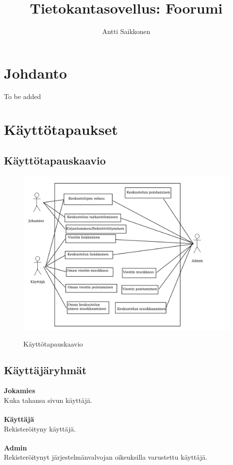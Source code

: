 \documentclass[11pt]{article}
\title{\textbf{Tietokantasovellus: Foorumi}}
\author{Antti Saikkonen}
\date{}
\begin{document}
\maketitle
\newpage

\section{Johdanto}
To be added


\newpage
\section{Käyttötapaukset}

\subsection{Käyttötapauskaavio}
\begin{figure}[h]
\centering 
{\includegraphics[scale=0.32]{Kayttotapauskaavio.png}}
\caption{Käyttötapauskaavio}
\par
\end{figure}

\subsection{Käyttäjäryhmät}
\textbf{Jokamies}\\
Kuka tahansa sivun käyttäjä.\\\\
\textbf{Käyttäjä}\\
Rekisteröityny käyttäjä.\\\\
\textbf{Admin}\\
Rekisteröitynyt järjestelmänvalvojan oikeuksilla varustettu käyttäjä.
\end{document}
